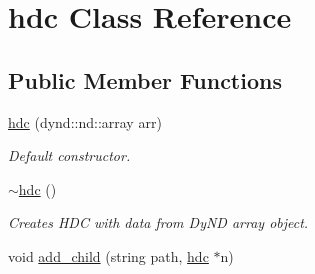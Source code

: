 \hypertarget{a00003}{}\section{hdc Class Reference}
\label{a00003}
\subsection*{Public Member Functions}
\begin{DoxyCompactItemize}
\item 
\hyperlink{a00003_a0dd2786f4236f02ac3c5895a9f9dc0fd}{hdc} (dynd\+::nd\+::array arr)
\begin{DoxyCompactList}\small\item\em Default constructor. \end{DoxyCompactList}\item 
\hyperlink{a00003_a18f8ee62caf1d5ae22d65d9dd330f9cc}{$\sim$hdc} ()
\begin{DoxyCompactList}\small\item\em Creates H\+DC with data from Dy\+ND array object. \end{DoxyCompactList}\item 
void \hyperlink{a00003_a6ae2658ee66a5f4fb0d0d6535b36c5b2}{add\+\_\+child} (string path, \hyperlink{a00003}{hdc} $\ast$n)\hypertarget{a00003_a6ae2658ee66a5f4fb0d0d6535b36c5b2}{}\label{a00003_a6ae2658ee66a5f4fb0d0d6535b36c5b2}


\end{DoxyCompactItemize}
